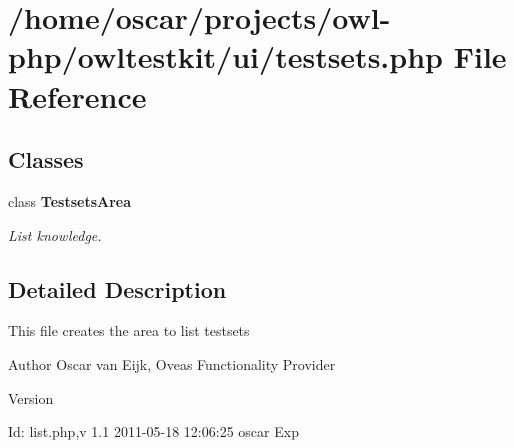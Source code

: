 \section{/home/oscar/projects/owl-\/php/owltestkit/ui/testsets.php File Reference}
\label{testsets_8php}
\subsection*{Classes}
\begin{DoxyCompactItemize}
\item 
class {\bf TestsetsArea}
\begin{DoxyCompactList}\small\item\em List knowledge. \end{DoxyCompactList}\end{DoxyCompactItemize}


\subsection{Detailed Description}
This file creates the area to list testsets \begin{DoxyAuthor}{Author}
Oscar van Eijk, Oveas Functionality Provider 
\end{DoxyAuthor}
\begin{DoxyVersion}{Version}

\end{DoxyVersion}
\begin{DoxyParagraph}{Id:}
list.php,v 1.1 2011-\/05-\/18 12:06:25 oscar Exp 
\end{DoxyParagraph}

